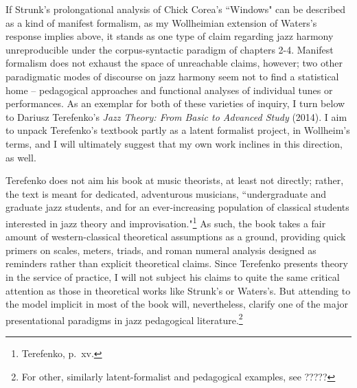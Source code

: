 If Strunk's prolongational analysis of Chick Corea's ``Windows" can be described as a kind of manifest formalism, as my Wollheimian extension of Waters's response implies above, it stands as one type of claim regarding jazz harmony unreproducible under the corpus-syntactic paradigm of chapters 2-4.  Manifest formalism does not exhaust the space of unreachable claims, however; two other paradigmatic modes of discourse on jazz harmony seem not to find a statistical home -- pedagogical approaches and functional analyses of individual tunes or performances.  As an exemplar for both of these varieties of inquiry, I turn below to Dariusz Terefenko's \emph{Jazz Theory: From Basic to Advanced Study} (2014).  I aim to unpack Terefenko's textbook partly as a latent formalist project, in Wollheim's terms, and I will ultimately suggest that my own work inclines in this direction, as well.

Terefenko does not aim his book at music theorists, at least not directly; rather, the text is meant for dedicated, adventurous musicians, ``undergraduate and graduate jazz students, and for an ever-increasing population of classical students interested in jazz theory and improvisation."\footnote{Terefenko, p.\ xv.}  As such, the book takes a fair amount of western-classical theoretical assumptions as a ground, providing quick primers on scales, meters, triads, and roman numeral analysis designed as reminders rather than explicit theoretical claims.  Since Terefenko presents theory in the service of practice, I will not subject his claims to quite the same critical attention as those in theoretical works like Strunk's or Waters's.  But attending to the model implicit in most of the book will, nevertheless, clarify one of the major presentational paradigms in jazz pedagogical literature.\footnote{For other, similarly latent-formalist and pedagogical examples, see ?????}

